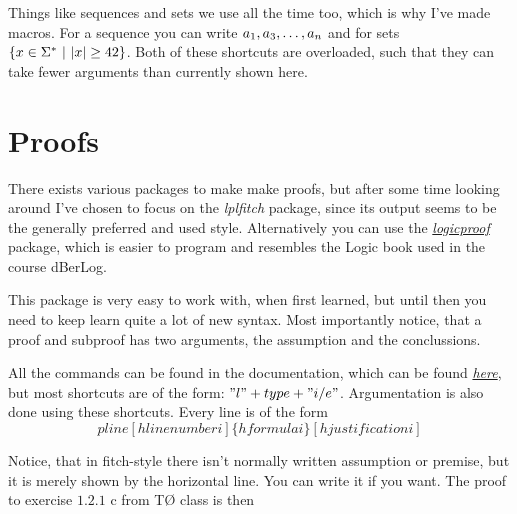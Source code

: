 \documentclass[a4, english]{article}
\begin{document}
Things like sequences and sets we use all the time too, which is why I've made macros. For a sequence you can write $\seq{a}{1}{n}{2}$ and for sets $ \set{x \in \Sigma^*}{ |x| \geq 42 } $. Both of these shortcuts are overloaded, such that they can take fewer arguments than currently shown here.

\section{Proofs}
There exists various packages to make make proofs, but after some time looking around I've chosen to focus on the \emph{lplfitch} package, since its output seems to be the generally preferred and used style. Alternatively you can use the \href{http://mirrors.dotsrc.org/ctan/macros/latex/contrib/logicproof/logicproof.pdf}{\emph{logicproof}} package, which is easier to program and resembles the Logic book used in the course dBerLog.

This package is very easy to work with, when first learned, but until then you need to keep learn quite a lot of new syntax. Most importantly notice, that a proof and subproof has two arguments, the assumption and the conclussions.
\begin{center}
\end{center}

All the commands can be found in the documentation, which can be found \href{http://mirrors.dotsrc.org/ctan/macros/latex/contrib/lplfitch/lplfitch.pdf}{\emph{here}}, but most shortcuts are of the form: $"l" + type + "i/e"$. Argumentation is also done using these shortcuts. Every line is of the form
\begin{equation*}
    pline[hline number i]\{hformulai\}[hjustificationi]
\end{equation*}

Notice, that in fitch-style there isn't normally written assumption or premise, but it is merely shown by the horizontal line. You can write it if you want. The proof to exercise $1.2.1$ c from TØ class is then
\begin{center}
\end{center}
\end{document}
